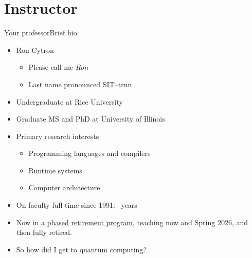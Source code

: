 \section{Instructor}
\begin{frame}{Your professor}{Brief bio}
\begin{itemize}
    \item Ron Cytron
    \begin{itemize}
        \item Please call me \emph{Ron}
        \item Last name pronounced SIT--trun
    \end{itemize}
    \item Undergraduate at Rice University
    \item Graduate MS and PhD at University of Illinois
    \item Primary research interests
    \begin{itemize}
        \item Programming languages and compilers
        \item Runtime systems
        \item Computer architecture
    \end{itemize}
        \item On faculty full time since 1991: \number\numexpr{}\relax~years
        \item Now in a \href{https://hr.wustl.edu/benefits/change/phased-retirement-for-faculty/}{phased retirement program}, teaching now and Spring 2026, and then fully retired.

    \item So how did I get to quantum computing?
\end{itemize}
    
\end{frame}

